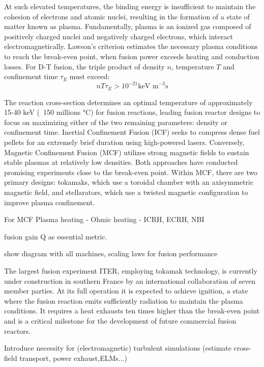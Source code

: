 At such elevated temperatures, the binding energy is insufficient to maintain the cohesion of electrons and atomic nuclei, resulting in the formation of a state of matter known as plasma. Fundamentally, plasma is an ionized gas composed of positively charged nuclei and negatively charged electrons, which interact electromagnetically. 
\newline
Lawson's criterion\cite{Lawson1957} estimates the necessary plasma conditions to reach the break-even point, when fusion power exceeds heating and conduction losses. For D-T fusion, the triple product of density $n$, temperature $T$ and confinement time $\tau_E$ must exceed:
\begin{equation}
	\label{eq:LawsonCriterionDT}
	nT\tau_E > 10^{-21} \text{keV m}^{-3}\text{s}
\end{equation}
 
The reaction cross-section determines an optimal temperature of approximately 15-40 keV  (~150 millions °C) for fusion reactions, leading fusion reactor designs to focus on maximizing either of the two remaining parameters: density or confinement time. Inertial Confinement Fusion (ICF) seeks to compress dense fuel pellets for an extremely brief duration using high-powered lasers. Conversely, Magnetic Confinement Fusion (MCF) utilizes strong magnetic fields to sustain stable plasmas at relatively low densities. Both approaches have conducted promising experiments close to the break-even point. Within MCF, there are two primary designs: tokamaks, which use a toroidal chamber with an axisymmetric magnetic field, and stellarators, which use a twisted magnetic configuration to improve plasma confinement.
\newline

For MCF
Plasma heating
- Ohmic heating
- ICRH, ECRH, NBI

fusion gain Q as essential metric.

show diagram with all machines, scaling laws for fusion performance

The largest fusion experiment ITER, employing tokamak technology, is currently under construction in southern France by an international collaboration of seven member parties. At its full operation it is expected to achieve ignition, a state where the fusion reaction emits sufficiently radiation to maintain the plasma conditions. It requires a heat exhausts ten times higher than the break-even point and is a critical milestone for the development of future commercial fusion reactors. 

Introduce necessity for (electromagnetic) turbulent simulations (estimate cross-field transport, power exhaust,ELMs...)